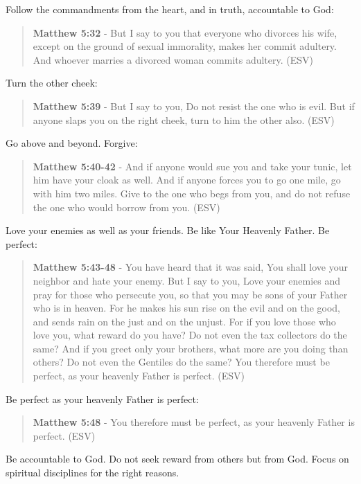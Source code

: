 \documentclass[11pt]{article}
\begin{document}
Follow the commandments from the heart, and in truth, accountable to God:

\begin{quote}
\textbf{Matthew 5:32} - But I say to you that everyone who divorces his wife, except on the ground of sexual immorality, makes her commit adultery. And whoever marries a divorced woman commits adultery. (ESV)
\end{quote}

Turn the other cheek:

\begin{quote}
\textbf{Matthew 5:39} - But I say to you, Do not resist the one who is evil. But if anyone slaps you on the right cheek, turn to him the other also. (ESV)
\end{quote}

Go above and beyond. Forgive:

\begin{quote}
\textbf{Matthew 5:40-42} - And if anyone would sue you and take your tunic, let him have your cloak as well. And if anyone forces you to go one mile, go with him two miles. Give to the one who begs from you, and do not refuse the one who would borrow from you. (ESV)
\end{quote}

Love your enemies as well as your friends. Be like Your Heavenly Father. Be perfect:

\begin{quote}
\textbf{Matthew 5:43-48} - You have heard that it was said, You shall love your neighbor and hate your enemy. But I say to you, Love your enemies and pray for those who persecute you, so that you may be sons of your Father who is in heaven. For he makes his sun rise on the evil and on the good, and sends rain on the just and on the unjust. For if you love those who love you, what reward do you have? Do not even the tax collectors do the same? And if you greet only your brothers, what more are you doing than others? Do not even the Gentiles do the same? You therefore must be perfect, as your heavenly Father is perfect. (ESV)
\end{quote}

Be perfect as your heavenly Father is perfect:

\begin{quote}
\textbf{Matthew 5:48} - You therefore must be perfect, as your heavenly Father is perfect. (ESV)
\end{quote}

Be accountable to God. Do not seek reward from others but from God. Focus on spiritual disciplines for the right reasons. 
\end{document}

